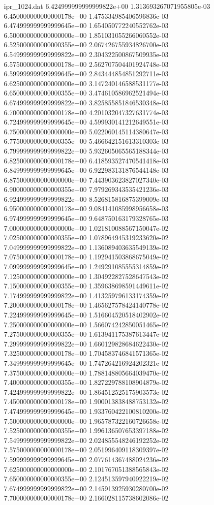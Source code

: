 \begin{filecontents}{ipr_1024.dat}
6.424999999999999822e+00 1.313693267071955805e-03
6.450000000000000178e+00 1.475334985406596836e-03
6.474999999999999645e+00 1.654050772240552762e-03
6.500000000000000000e+00 1.851031055266060552e-03
6.525000000000000355e+00 2.067426755934826700e-03
6.549999999999999822e+00 2.304322500867509935e-03
6.575000000000000178e+00 2.562707504401924748e-03
6.599999999999999645e+00 2.843444854851292711e-03
6.625000000000000000e+00 3.147240146588531177e-03
6.650000000000000355e+00 3.474610586962521494e-03
6.674999999999999822e+00 3.825855851846530348e-03
6.700000000000000178e+00 4.201032047327631774e-03
6.724999999999999645e+00 4.599930141212649551e-03
6.750000000000000000e+00 5.022060145114380647e-03
6.775000000000000355e+00 5.466642151613310303e-03
6.799999999999999822e+00 5.932605065565188344e-03
6.825000000000000178e+00 6.418593527470541418e-03
6.849999999999999645e+00 6.922983131876544148e-03
6.875000000000000000e+00 7.443903623827027340e-03
6.900000000000000355e+00 7.979269343535421236e-03
6.924999999999999822e+00 8.526815816875399009e-03
6.950000000000000178e+00 9.084141085998956658e-03
6.974999999999999645e+00 9.648750163179328765e-03
7.000000000000000000e+00 1.021810088567150047e-02
7.025000000000000355e+00 1.078964945319233620e-02
7.049999999999999822e+00 1.136089403635549139e-02
7.075000000000000178e+00 1.192941503868675049e-02
7.099999999999999645e+00 1.249291085555314859e-02
7.125000000000000000e+00 1.304922827528647543e-02
7.150000000000000355e+00 1.359638698591449611e-02
7.174999999999999822e+00 1.413259796133174359e-02
7.200000000000000178e+00 1.465627578424140778e-02
7.224999999999999645e+00 1.516604520518402902e-02
7.250000000000000000e+00 1.566074242850051465e-02
7.275000000000000355e+00 1.613941175387613447e-02
7.299999999999999822e+00 1.660129828684622430e-02
7.325000000000000178e+00 1.704583746841571365e-02
7.349999999999999645e+00 1.747264216924202321e-02
7.375000000000000000e+00 1.788148805664039470e-02
7.400000000000000355e+00 1.827229788108904879e-02
7.424999999999999822e+00 1.864512525175903573e-02
7.450000000000000178e+00 1.900013838488753132e-02
7.474999999999999645e+00 1.933760422100810200e-02
7.500000000000000000e+00 1.965787322160726658e-02
7.525000000000000355e+00 1.996136507653397188e-02
7.549999999999999822e+00 2.024855548246192252e-02
7.575000000000000178e+00 2.051996409118309397e-02
7.599999999999999645e+00 2.077614367488024236e-02
7.625000000000000000e+00 2.101767051388565843e-02
7.650000000000000355e+00 2.124513597940922219e-02
7.674999999999999822e+00 2.145913925930280700e-02
7.700000000000000178e+00 2.166028115738602086e-02

\end{filecontents}
